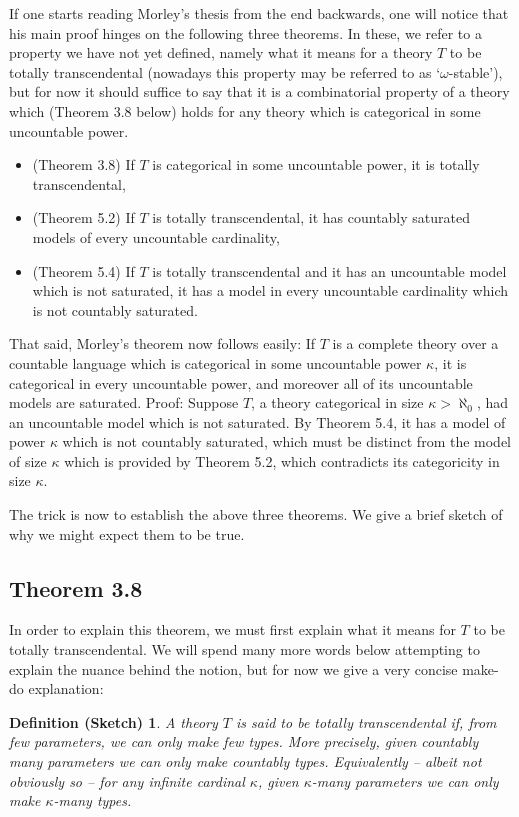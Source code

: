 \documentclass{article}
\newtheorem{defsketch}[theorem]{Definition (Sketch)}
\theoremstyle{nonumberplain}
\begin{document}
If one starts reading Morley's thesis from the end backwards, one will notice that his main proof hinges on the following three theorems. In these, we refer to a property we have not yet defined, namely what it means for a theory $T$ to be totally transcendental (nowadays this property may be referred to as `$\omega$-stable'), but for now it should suffice to say that it is a combinatorial property of a theory which (Theorem 3.8 below) holds for any theory which is categorical in some uncountable power.

\begin{itemize}
\item (Theorem 3.8) If $T$ is categorical in some uncountable power, it is totally transcendental,
\item (Theorem 5.2) If $T$ is totally transcendental, it has countably saturated models of every uncountable cardinality,
\item (Theorem 5.4) If $T$ is totally transcendental and it has an uncountable model which is not saturated, it has a model in every uncountable cardinality which is not countably saturated.
\end{itemize}

That said, Morley's theorem now follows easily: If $T$ is a complete theory over a countable language which is categorical in some uncountable power $\kappa$, it is categorical in every uncountable power, and moreover all of its uncountable models are saturated. Proof: Suppose $T$, a theory categorical in size $\kappa > \aleph_0$, had an uncountable model which is not saturated. By Theorem 5.4, it has a model of power $\kappa$ which is not countably saturated, which must be distinct from the model of size $\kappa$ which is provided by Theorem 5.2, which contradicts its categoricity in size $\kappa$.

The trick is now to establish the above three theorems. We give a brief sketch of why we might expect them to be true.

\subsection{Theorem 3.8}

In order to explain this theorem, we must first explain what it means for $T$ to be totally transcendental. We will spend many more words below attempting to explain the nuance behind the notion, but for now we give a very concise make-do explanation:
\begin{defsketch}\label{defsketch:tt}
A theory $T$ is said to be totally transcendental if, from few parameters, we can only make few types. More precisely, given countably many parameters we can only make countably types. Equivalently -- albeit not obviously so -- for any infinite cardinal $\kappa$, given $\kappa$-many parameters we can only make $\kappa$-many types.
\end{defsketch}
\end{document}
